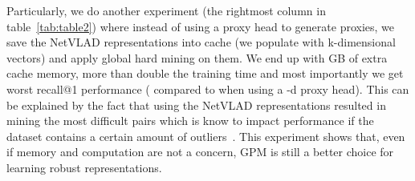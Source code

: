 \documentclass{bmvc2k}
\begin{document}
Particularly, we do another experiment (the rightmost column in table~\ref{tab:table2}) where instead of using a proxy head to generate proxies, we save the NetVLAD representations into cache (we populate  with k-dimensional vectors) and apply global hard mining on them. We end up with GB of extra cache memory, more than double the training time and most importantly we get worst recall@1 performance ( compared to  when using a -d proxy head). This can be explained by the fact that using the NetVLAD representations resulted in mining the most difficult pairs which is know to impact performance if the dataset contains a certain amount of outliers~\cite{hermans2017defense}. This experiment shows that, even if memory and computation are not a concern, GPM is still a better choice for learning robust representations.

\begin{table}[th]
\centering
{}
\end{table}
\end{document}
